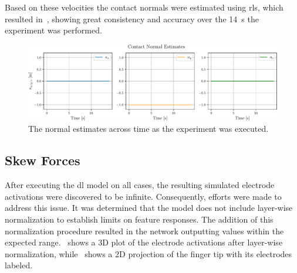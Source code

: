 Based on these velocities the contact normals were estimated using \gls{rls}, which resulted in~, showing great consistency and accuracy over the \SI{14}{\second} the experiment was performed.

\begin{figure}[!h]
	\begin{center}
		\includegraphics[width=\textwidth]{chapters/1-tactile-perception/fig/matplotlib/contact-normal-estimates.pdf}
	\end{center}
	\caption{The normal estimates across time as the experiment was executed.}
	\label{fig:contact-normal-estimates}
\end{figure}

\subsection{Skew Forces} \label{sec:1-tactile-perception-results-skew-forces}

After executing the \gls{dl} model on all cases, the resulting simulated electrode activations were discovered to be infinite. Consequently, efforts were made to address this issue. It was determined that the model does not include layer-wise normalization to establish limits on feature responses. The addition of this normalization procedure resulted in the network outputting values within the expected range.~ shows a 3D plot of the electrode activations after layer-wise normalization, while~ shows a 2D projection of the finger tip with its electrodes labeled.

